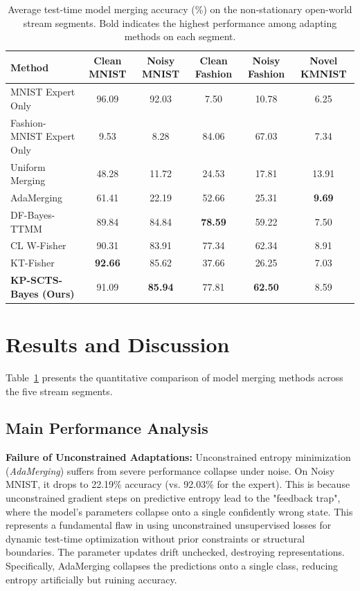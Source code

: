 \documentclass{article}
\theoremstyle{plain}
\theoremstyle{definition}
\theoremstyle{remark}
\begin{document}
\begin{table}[t]
\caption{Average test-time model merging accuracy (\%) on the non-stationary open-world stream segments. Bold indicates the highest performance among adapting methods on each segment.}
\label{submission-tab:results}
\vskip 0.15in
\begin{center}
\begin{small}
\begin{sc}
\begin{tabular}{lccccc}
\toprule
Method & Clean MNIST & Noisy MNIST & Clean Fashion & Noisy Fashion & Novel KMNIST \\
\midrule
MNIST Expert Only & 96.09 & 92.03 & 7.50 & 10.78 & 6.25 \\
Fashion-MNIST Expert Only & 9.53 & 8.28 & 84.06 & 67.03 & 7.34 \\
Uniform Merging & 48.28 & 11.72 & 24.53 & 17.81 & 13.91 \\
\midrule
AdaMerging & 61.41 & 22.19 & 52.66 & 25.31 & \textbf{9.69} \\
DF-Bayes-TTMM & 89.84 & 84.84 & \textbf{78.59} & 59.22 & 7.50 \\
CL W-Fisher & 90.31 & 83.91 & 77.34 & 62.34 & 8.91 \\
KT-Fisher & \textbf{92.66} & 85.62 & 37.66 & 26.25 & 7.03 \\
\midrule
\textbf{KP-SCTS-Bayes (Ours)} & 91.09 & \textbf{85.94} & 77.81 & \textbf{62.50} & 8.59 \\
\bottomrule
\end{tabular}
\end{sc}
\end{small}
\end{center}
\vskip -0.1in
\end{table}

\section{Results and Discussion}
\label{submission-sec:results}
Table~\ref{submission-tab:results} presents the quantitative comparison of model merging methods across the five stream segments.

\subsection{Main Performance Analysis}
\textbf{Failure of Unconstrained Adaptations:} Unconstrained entropy minimization (\textit{AdaMerging}) suffers from severe performance collapse under noise. On Noisy MNIST, it drops to 22.19\% accuracy (vs. 92.03\% for the expert). This is because unconstrained gradient steps on predictive entropy lead to the "feedback trap", where the model's parameters collapse onto a single confidently wrong state. This represents a fundamental flaw in using unconstrained unsupervised losses for dynamic test-time optimization without prior constraints or structural boundaries. The parameter updates drift unchecked, destroying representations. Specifically, AdaMerging collapses the predictions onto a single class, reducing entropy artificially but ruining accuracy.
\end{document}
